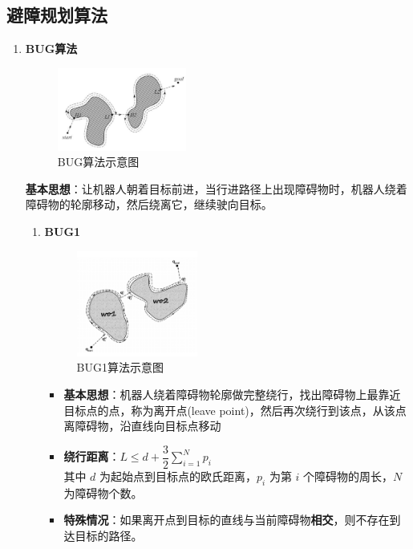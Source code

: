 \documentclass[../main.tex]{subfiles}
\begin{document}
\subsection{避障规划算法}
\begin{enumerate}
    \item \textbf{BUG算法}\label{bug}
        \begin{figure}[H]
            \centering
            \includegraphics[width=0.4\textwidth]{images/bug.png}
            \caption{BUG算法示意图}
        \end{figure}
        \textbf{基本思想}：让机器人朝着目标前进，当行进路径上出现障碍物时，机器人绕着障碍物的轮廓移动，然后绕离它，继续驶向目标。
        \begin{enumerate}
            \item \textbf{BUG1}\label{bug1}
                    \begin{figure}[H]
                        \centering
                        \includegraphics[width=0.4\textwidth]{images/bug1.png}
                        \caption{BUG1算法示意图}
                    \end{figure}
                \begin{itemize}
                    \item \textbf{基本思想}：机器人绕着障碍物轮廓做完整绕行，找出障碍物上最靠近目标点的点，称为离开点(leave point)，然后再次绕行到该点，从该点离障碍物，沿直线向目标点移动
                    \item \textbf{绕行距离}：$L \leq d + \dfrac{3}{2} \sum_{i=1}^{N} p_i$
                    \\其中 $d$ 为起始点到目标点的欧氏距离，$p_i$ 为第 $i$ 个障碍物的周长，$N$ 为障碍物个数。
                    \item \textbf{特殊情况}：如果离开点到目标的直线与当前障碍物\textbf{相交}，则不存在到达目标的路径。

\end{itemize}
\end{enumerate}
\end{enumerate}
\end{document}
